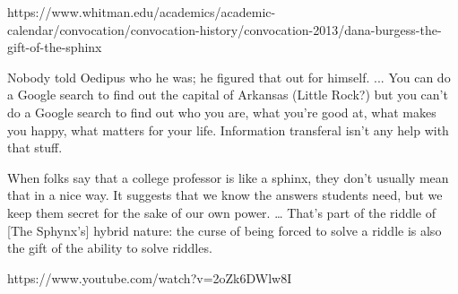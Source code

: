 https://www.whitman.edu/academics/academic-calendar/convocation/convocation-history/convocation-2013/dana-burgess-the-gift-of-the-sphinx

Nobody told Oedipus who he was; he figured that out for himself.  ... You can do a Google search to find out the capital of Arkansas (Little Rock?) but you can’t do a Google search to find out who you are, what you’re good at, what makes you happy, what matters for your life.  Information transferal isn’t any help with that stuff.

When folks say that a college professor is like a sphinx, they don’t usually mean that in a nice way.  It suggests that we know the answers students need, but we keep them secret for the sake of our own power.  … That’s part of the riddle of [The Sphynx’s] hybrid nature: the curse of being forced to solve a riddle is also the gift of the ability to solve riddles. 

https://www.youtube.com/watch?v=2oZk6DWlw8I


